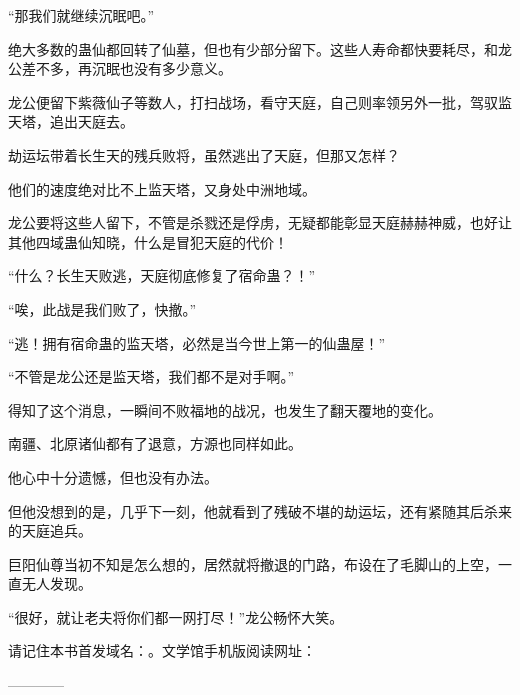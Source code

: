 \begin{this_body}
“那我们就继续沉眠吧。”

绝大多数的蛊仙都回转了仙墓，但也有少部分留下。这些人寿命都快要耗尽，和龙公差不多，再沉眠也没有多少意义。

龙公便留下紫薇仙子等数人，打扫战场，看守天庭，自己则率领另外一批，驾驭监天塔，追出天庭去。

劫运坛带着长生天的残兵败将，虽然逃出了天庭，但那又怎样？

他们的速度绝对比不上监天塔，又身处中洲地域。

龙公要将这些人留下，不管是杀戮还是俘虏，无疑都能彰显天庭赫赫神威，也好让其他四域蛊仙知晓，什么是冒犯天庭的代价！

“什么？长生天败逃，天庭彻底修复了宿命蛊？！”

“唉，此战是我们败了，快撤。”

“逃！拥有宿命蛊的监天塔，必然是当今世上第一的仙蛊屋！”

“不管是龙公还是监天塔，我们都不是对手啊。”

得知了这个消息，一瞬间不败福地的战况，也发生了翻天覆地的变化。

南疆、北原诸仙都有了退意，方源也同样如此。

他心中十分遗憾，但也没有办法。

但他没想到的是，几乎下一刻，他就看到了残破不堪的劫运坛，还有紧随其后杀来的天庭追兵。

巨阳仙尊当初不知是怎么想的，居然就将撤退的门路，布设在了毛脚山的上空，一直无人发现。

“很好，就让老夫将你们都一网打尽！”龙公畅怀大笑。

请记住本书首发域名：。文学馆手机版阅读网址：

------------

\end{this_body}


